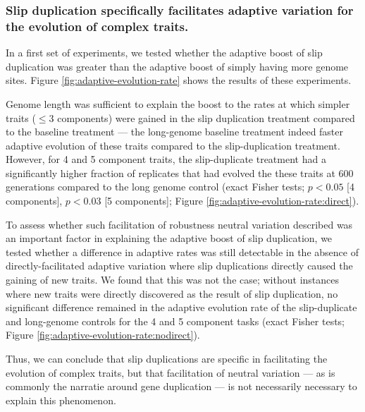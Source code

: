 \subsubsection{Slip duplication specifically facilitates adaptive variation for the evolution of complex traits.}



In a first set of experiments, we tested whether the adaptive boost of slip duplication was greater than the adaptive boost of simply having more genome sites.
Figure \ref{fig:adaptive-evolution-rate} shows the results of these experiments.

Genome length was sufficient to explain the boost to the rates at which simpler traits ($\leq 3$ components) were gained in the slip duplication treatment compared to the baseline treatment --- the long-genome baseline treatment indeed faster adaptive evolution of these traits compared to the slip-duplication treatment.
However, for 4 and 5 component traits, the slip-duplicate treatment had a significantly higher fraction of replicates that had evolved the these traits at 600 generations compared to the long genome control (exact Fisher tests; $p<0.05$ [4 components], $p < 0.03$ [5 components]; Figure \ref{fig:adaptive-evolution-rate:direct}).

To assess whether such facilitation of robustness neutral variation described  was an important factor in explaining the adaptive boost of slip duplication, we tested whether a difference in adaptive rates was still detectable in the absence of directly-facilitated adaptive variation where slip duplications directly caused the gaining of new traits.
We found that this was not the case; without instances where new traits were directly discovered as the result of slip duplication, no significant difference remained in the adaptive evolution rate of the slip-duplicate and long-genome controls for the 4 and 5 component tasks (exact Fisher tests; Figure \ref{fig:adaptive-evolution-rate:nodirect}).

Thus, we can conclude that slip duplications are specific in facilitating the evolution of complex traits, but that facilitation of neutral variation --- as is commonly the narratie around gene duplication --- is not necessarily necessary to explain this phenomenon.

